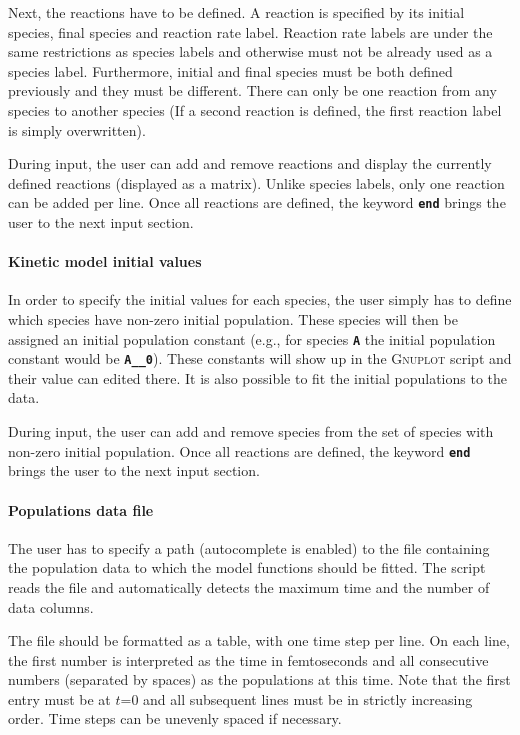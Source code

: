 \documentclass[a4paper,11pt,DIV=15,openany,twoside=false]{scrbook}
\newcommand{\ttt}[1]{\textbf{\texttt{#1}}}
\begin{document}
Next, the reactions have to be defined.
A reaction is specified by its initial species, final species and reaction rate label.
Reaction rate labels are under the same restrictions as species labels and otherwise must not be already used as a species label.
Furthermore, initial and final species must be both defined previously and they must be different.
There can only be one reaction from any species to another species (If a second reaction is defined, the first reaction label is simply overwritten).

During input, the user can add and remove reactions and display the currently defined reactions (displayed as a matrix).
Unlike species labels, only one reaction can be added per line.
Once all reactions are defined, the keyword \ttt{end} brings the user to the next input section.

\paragraph{Kinetic model initial values}

In order to specify the initial values for each species, the user simply has to define which species have non-zero initial population.
These species will then be assigned an initial population constant (e.g., for species \ttt{A} the initial population constant would be \ttt{A\_\_0}).
These constants will show up in the \textsc{Gnuplot} script and their value can edited there.
It is also possible to fit the initial populations to the data.

During input, the user can add and remove species from the set of species with non-zero initial population.
Once all reactions are defined, the keyword \ttt{end} brings the user to the next input section.

\paragraph{Populations data file}

The user has to specify a path (autocomplete is enabled) to the file containing the population data to which the model functions should be fitted.
The script reads the file and automatically detects the maximum time and the number of data columns.

The file should be formatted as a table, with one time step per line. 
On each line, the first number is interpreted as the time in femtoseconds and all consecutive numbers (separated by spaces) as the populations at this time.
Note that the first entry must be at $t$=0 and all subsequent lines must be in strictly increasing order.
Time steps can be unevenly spaced if necessary.
\end{document}
